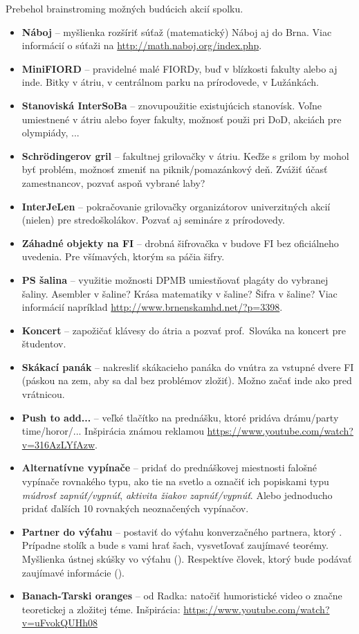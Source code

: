 \documentclass[11pt,a4paper]{article}
\begin{document}
Prebehol brainstroming možných budúcich akcií spolku.
\begin{itemize}[itemsep=0pt]
\item \textbf{Náboj} -- myšlienka rozšíriť súťaž (matematický) Náboj aj do Brna. Viac informácií o súťaži na \url{http://math.naboj.org/index.php}.
\item \textbf{MiniFIORD} -- pravidelné malé FIORDy, buď v blízkosti fakulty alebo aj inde. Bitky v átriu, v centrálnom parku na prírodovede, v Lužánkách.
\item \textbf{Stanoviská InterSoBa} -- znovupoužitie existujúcich stanovísk. Voľne umiestnené v átriu alebo foyer fakulty, možnosť použi pri DoD, akciách pre olympiády, ...
\item \textbf{Schrödingerov gril} --  fakultnej grilovačky v átriu. Keďže s grilom by mohol byť problém, možnosť zmeniť na piknik/pomazánkový deň. Zvážiť účasť zamestnancov, pozvať aspoň vybrané laby?
\item \textbf{InterJeLen} -- pokračovanie grilovačky organizátorov univerzitných akcií (nielen) pre stredoškolákov. Pozvať aj semináre z prírodovedy.
\item \textbf{Záhadné objekty na FI} -- drobná šifrovačka v budove FI bez oficiálneho uvedenia. Pre všímavých, ktorým sa páčia šifry.
\item \textbf{PS šalina} -- využitie možnosti DPMB umiestňovať plagáty do vybranej šaliny. Asembler v šaline? Krása matematiky v šaline? Šifra v šaline? Viac informácií napríklad \url{http://www.brnenskamhd.net/?p=3398}.
\item \textbf{Koncert} -- zapožičať klávesy do átria a pozvať prof.\ Slováka na koncert pre študentov.
\item \textbf{Skákací panák} -- nakresliť skákacieho panáka do vnútra za vstupné dvere FI (páskou na zem, aby sa dal bez problémov zložiť). Možno začať inde ako pred vrátnicou.
\item \textbf{Push to add...} -- veľké tlačítko na prednášku, ktoré pridáva drámu/party time/horor/... Inšpirácia známou reklamou \url{https://www.youtube.com/watch?v=316AzLYfAzw}.
\item \textbf{Alternatívne vypínače} -- pridať do prednáškovej miestnosti falošné vypínače rovnakého typu, ako tie na svetlo a označiť ich popiskami typu \textit{múdrosť zapnúť/vypnúť}, \textit{aktivita žiakov zapnúť/vypnúť}. Alebo jednoducho pridať ďalších 10 rovnakých neoznačených vypínačov.
\item \textbf{Partner do výťahu} -- postaviť do výťahu konverzačného partnera, ktorý . Prípadne stolík a bude s vami hrať šach, vysvetľovať zaujímavé teorémy. Myšlienka ústnej skúšky vo výťahu (). Respektíve človek, ktorý bude podávať zaujímavé informácie ().
\item \textbf{Banach-Tarski oranges} -- od Radka: natočiť humoristické video o značne teoretickej a zložitej téme. Inšpirácia: \url{https://www.youtube.com/watch?v=uFvokQUHh08}
\end{itemize}
\end{document}
